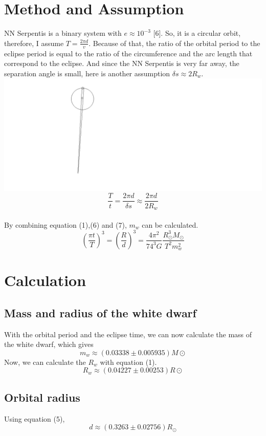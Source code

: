\documentclass[10pt,journal,compsoc]{IEEEtran}
\begin{document}
\section{Method and Assumption}
NN Serpentis is a binary system with $e\approx10^{-3}$ [6]. So, it is a circular orbit, therefore, I assume $T=\frac{2\pi d}{v}$. Because of that, the ratio of the orbital period to the eclipse period is equal to the ratio of the circumference and the arc length that correspond to the eclipse. And since the NN Serpentis is very far away, the separation angle is small, here is another assumption $\delta s\approx2R_w$.
\includegraphics[scale=0.3]{image_2.png}
\begin{equation}
\frac{T}{t}=\frac{2\pi d}{\delta s}\approx\frac{2\pi d}{2R_w}
\end{equation}
\\ By combining equation (1),(6) and (7), $m_w$ can be calculated.
\begin{equation}
(\frac{\pi t}{T})^{3}=(\frac{R}{d})^{3}=\frac{4\pi^{2}}{74^{3}G}\frac{R_\odot^{3}M_\odot}{T^{2}m_w^{2}}
\end{equation}
\section{Calculation}
\subsection{Mass and radius of the white dwarf}
With the orbital period and the eclipse time, we can now calculate the mass of the white dwarf, which gives $$m_w\approx(0.03338\pm0.005935)M\odot$$Now, we can calculate the $R_w$ with equation (1).$$R_w\approx(0.04227\pm0.00253)R\odot$$

\subsection{Orbital radius}
Using equation (5),$$d\approx(0.3263\pm0.02756)R_\odot$$
\end{document}
